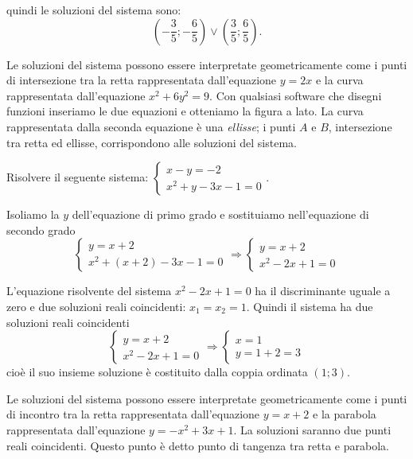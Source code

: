 \begin{exrig}
\begin{esempio}
\begin{itemize*}
quindi le soluzioni del sistema sono:
\[\left(-\frac 3 5;-\frac 6 5\right)\vee \left(\frac 3 5;\frac 6 5\right).\]
\end{itemize*}
\begin{multicols}{2}
Le soluzioni del sistema possono essere interpretate geometricamente come i punti di intersezione tra la retta rappresentata dall'equazione $y=2x$ e la curva rappresentata dall'equazione $x^2+6y^2=9$. Con qualsiasi software che disegni funzioni inseriamo le due equazioni e otteniamo la figura a lato.
La curva rappresentata dalla seconda equazione è una \emph{ellisse}; i punti $A$ e $B$, intersezione tra retta ed ellisse, corrispondono alle soluzioni del sistema.
\begin{center}

\end{center}
 \end{multicols}
\end{esempio}

\begin{esempio}
Risolvere il seguente sistema: $\left\{\begin{array}{l}x-y=-2 \\x^2+y-3x-1=0\end{array}\right..$

Isoliamo la $y$ dell'equazione di primo grado e sostituiamo nell'equazione di secondo grado 
\[\left\{\begin{array}{l}y=x+2 \\
x^2+\left(x+2\right)-3x-1=0\end{array}\right. 
\Rightarrow\left\{\begin{array}{l}y=x+2 \\
x^2-2x+1=0\end{array}\right.\]

L'equazione risolvente del sistema $x^2-2x+1=0$ ha il discriminante uguale a zero e due soluzioni reali coincidenti: $x_1=x_2=1$. Quindi il sistema ha due soluzioni reali coincidenti 
\[\left\{\begin{array}{l}y=x+2 \\x^2-2x+1=0\end{array}\right. 
\Rightarrow\left\{\begin{array}{l}x=1 \\
y=1+2=3\end{array}\right.\] 
cioè il suo insieme soluzione è costituito dalla coppia ordinata $(1;3)$.
\begin{multicols}{2}
Le soluzioni del sistema possono essere interpretate geometricamente come i punti di incontro tra la retta rappresentata dall'equazione $y=x+2$ e la parabola rappresentata dall'equazione $y=-x^2+3x+1$. La soluzioni saranno due punti reali coincidenti. Questo punto è detto punto di tangenza tra retta e parabola.
\begin{center}

\end{center}
 \end{multicols}
\end{esempio}


\end{exrig}
